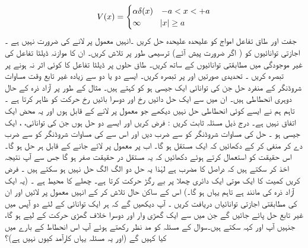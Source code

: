 \begin{align*}
V(x)=
\begin{cases}
\alpha\delta (x)& -a< x< +a\\
\infty &\abs{x}\ge a
\end{cases}
 \end{align*} 
 جفت اور طاق تفاعل امواج کو علیحدہ علیحدہ حل کریں ۔انہیں معمول پر لانے کی ضرورت نہیں ہے ۔ اجازتی توانائیوں کو ( اگر ضرورت پیش آئے) ترسیمی طور پر تلاش کریں۔ ان کا موازنہ ڈیلٹا تفاعل کی غیر موجودگی میں مطابقتی توانائیوں کے ساتھ کریں۔ طاق حلوں پر ڈیلٹا تفاعل کا کوئی اثر نہ ہونے پر تبصرہ کریں ۔ تحدیدی صورتیں  اور پر تبصرہ کریں۔ 
 ایسے دو یا دو سے زیادہ غیر تابع وقت مساوات شروڈنگر کے منفرد حل جن کی توانائی  ایک  جیسی ہو کو  کہتے ہیں۔ مثال کے طور پر آزاد ذرہ کے حال دوہری انحطاطی ہیں۔ ان میں سے ایک حل دائیں رخ اور دوسرا بائیں رخ حرکت کو ظاہر کرتا ہے ۔ تاہم ہم نے ایسے کوئی انحطاطی حل نہیں دیکھے جو معمول پر لانے کے قابل ہوں اور یہ محض ایک اتفاق نہیں ہے۔ 
 درج ذیل مسئلہ ثابت کریں : 
 فرض کریں
 اور  ایسے دو حل ہوں جن کی توانائی، ، ایک  جیسی ہو ۔ حل  کی مساوات شروڈنگر کو  سے ضرب دیں اور اس سے کی مساوات شروڈنگر کو  سے ضرب دے کر منفی کر کے دکھائیں کہ  ایک مستقل ہو گا۔
 اب  پر  معمول پر لائے جانے کے قابل ہر حل  ہو گا۔ اس حقیقت کو استعمال کرتے ہوئے دکھائیں کہ یہ مستقل در حقیقت صفر ہو گا جس سے آپ نتیجہ اخذ کر سکتے ہیں کہ  دراصل  کا مضرب ہے لہٰذا یہ حل دو الگ الگ حل نہیں ہو سکتے ہیں ۔
فرض کریں کمیت  کا ایک موتی ایک دائری چھلا پر بے رگڑ حرکت کرتا ہے۔ چھلے کا محیط  ہے ۔ (یہ ایک آزاد ذرہ کی مانند ہے تاہم یہاں ہو گا۔) اس کے ساکن حال تلاش کر کے انہیں معمول پر لائیں اور ان کی مطابقتی اجازتی توانائیاں دریافت کریں ۔ آپ دیکھیں گے کہ ہر ایک توانائی کے لئے دو آپس میں غیر تابع حل پائے جائیں گے جن میں سے ایک گھڑی وار اور دوسرا خلاف گھڑی حرکت کے لیے ہو گا، جنہیں آپ اور  کہہ سکتے ہیں۔سوال  کے مسئلہ کو مد نظر رکھتے ہوئے آپ اس انحطاط کے بارے میں کیا کہیں گے (اور یہ مسئلہ یہاں کارآمد کیوں نہیں ہے)؟ 

